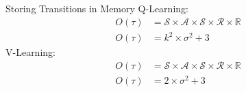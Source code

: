 \documentclass[aspectratio=169, 11pt, invertlogo]{ismll-slides}
\begin{document}

\begin{frame}[fragile]{Storing Transitions in Memory}
	Q-Learning:
	\begin{align*}
		O(\tau) &= \mathcal{S} \times \mathcal{A} \times \mathcal{S} \times \mathcal{R} \times \mathbb{R} \\
		O(\tau) &= k^2 \times \sigma^2 + 3
	\end{align*}
	V-Learning:
	\begin{align*}
		O(\tau) &= \mathcal{S} \times \mathcal{A} \times \mathcal{S} \times \mathcal{R} \times \mathbb{R} \\
		O(\tau) &= 2 \times \sigma^2 + 3
	\end{align*}
\end{frame}



\appendix


%
%




\begin{frame}[allowframebreaks]%
%
%
\end{frame}

\end{document}
